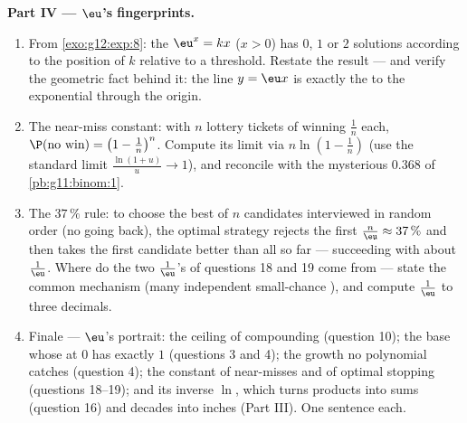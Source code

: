 \begin{problem}
\medskip
\noindent\textbf{Part IV --- $\eu$'s fingerprints.}
\begin{enumerate}[resume]
  \item From \cref{exo:g12:exp:8}: the 
        $\eu^x = kx$ ($x > 0$) has $0$, $1$ or $2$ solutions
        according to the position of $k$ relative to a
        threshold. Restate the result --- and verify the
        geometric fact behind it: the line $y = \eu x$ is
        exactly the  to the exponential through the
        origin.
  \item The near-miss constant: with $n$ lottery tickets of
        winning  $\frac1n$ each,
        $\P(\text{no win}) = \left(1 - \frac1n\right)^n$.
        Compute its limit via
        $n \ln\!\left(1 - \frac1n\right)$ (use the standard
        limit $\frac{\ln(1 + u)}{u} \to 1$), and reconcile with
        the mysterious $0.368$ of \cref{pb:g11:binom:1}.
  \item The $37\,\%$ rule: to choose the best of $n$
        candidates interviewed in random order (no going back),
        the optimal strategy rejects the first
        $\frac{n}{\eu} \approx 37\,\%$ and then takes the first
        candidate better than all so far --- succeeding with
         about $\frac1\eu$. Where do the two
        $\frac1\eu$'s of questions 18 and 19 come from ---
        state the common mechanism (many independent
        small-chance ), and compute $\frac1\eu$ to three
        decimals.
  \item Finale --- $\eu$'s portrait: the ceiling of compounding
        (question 10); the base whose  at $0$ has 
        exactly $1$ (questions 3 and 4); the growth no
        polynomial catches (question 4); the constant of
        near-misses and of optimal stopping (questions 18--19);
        and its inverse $\ln$, which turns products into sums
        (question 16) and decades into inches (Part III). One
        sentence each.
\end{enumerate}
\end{problem}
